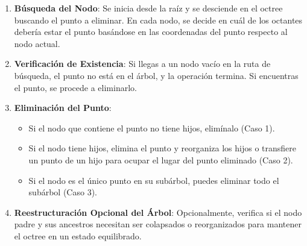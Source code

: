\documentclass{article}
\begin{document}
\begin{enumerate}
    \item \textbf{Búsqueda del Nodo}: Se inicia desde la raíz y se desciende en el octree buscando el punto a eliminar. En cada nodo, se decide en cuál de los octantes debería estar el punto basándose en las coordenadas del punto respecto al nodo actual.
    \item \textbf{Verificación de Existencia}: Si llegas a un nodo vacío en la ruta de búsqueda, el punto no está en el árbol, y la operación termina. Si encuentras el punto, se procede a eliminarlo.
    \item \textbf{Eliminación del Punto}: 
    \begin{itemize}
        \item Si el nodo que contiene el punto no tiene hijos, elimínalo (Caso 1).
        \item Si el nodo tiene hijos, elimina el punto y reorganiza los hijos o transfiere un punto de un hijo para ocupar el lugar del punto eliminado (Caso 2).
        \item Si el nodo es el único punto en su subárbol, puedes eliminar todo el subárbol (Caso 3).
    \end{itemize}
    \item \textbf{Reestructuración Opcional del Árbol}: Opcionalmente, verifica si el nodo padre y sus ancestros necesitan ser colapsados o reorganizados para mantener el octree en un estado equilibrado.
\end{enumerate}
\end{document}
